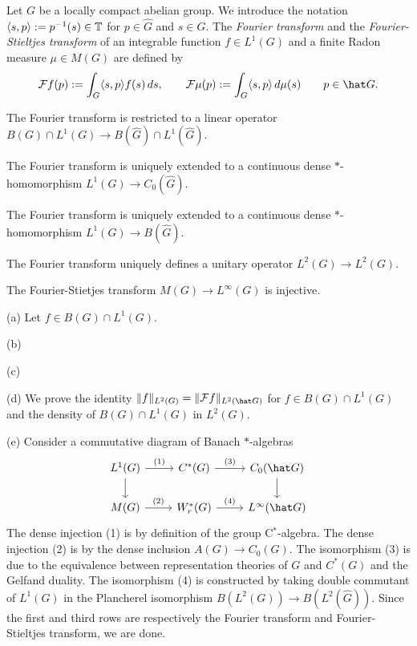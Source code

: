 \documentclass{../../large}
\begin{document}
\begin{prb}
Let $G$ be a locally compact abelian group.
We introduce the notation $\langle s,p\rangle:=p^{-1}(s)\in\mathbb{T}$ for $p\in\hat G$ and $s\in G$.
The \emph{Fourier transform} and the \emph{Fourier-Stieltjes transform} of an integrable function $f\in L^1(G)$ and a finite Radon measure $\mu\in M(G)$ are defined by
\[\cF f(p):=\int_G\<s,p\>f(s)\,ds,\qquad \cF\mu(p):=\int_G\<s,p\>\,d\mu(s)\qquad p\in\hat G.\]
\begin{parts}
\item The Fourier transform is restricted to a linear operator $B(G)\cap L^1(G)\to B(\hat G)\cap L^1(\hat G)$.
\item The Fourier transform is uniquely extended to a continuous dense $*$-homomorphism $L^1(G)\to C_0(\hat G)$.
\item The Fourier transform is uniquely extended to a continuous dense $*$-homomorphism $L^1(G)\to B(\hat G)$.
\item The Fourier transform uniquely defines a unitary operator $L^2(G)\to L^2(G)$.
\item The Fourier-Stietjes transform $M(G)\to L^\infty(G)$ is injective.
\end{parts}
\end{prb}
\begin{pf}
(a)
Let $f\in B(G)\cap L^1(G)$.


(b)

(c)

(d)
We prove the identity $\|f\|_{L^2(G)}=\|\cF f\|_{L^2(\hat G)}$ for $f\in B(G)\cap L^1(G)$ and the density of $B(G)\cap L^1(G)$ in $L^2(G)$.

(e)
Consider a commutative diagram of Banach $*$-algebras
\[\begin{tikzcd}
L^1(G) \rar{(1)}\dar & C^*(G) \rar{(3)} & C_0(\hat G) \dar\\
M(G) \rar{(2)} & W_r^*(G) \rar{(4)} & L^\infty(\hat G)
\end{tikzcd}\]
The dense injection (1) is by definition of the group C$^*$-algebra.
The dense injection (2) is by the dense inclusion $A(G)\to C_0(G)$.
The isomorphism (3) is due to the equivalence between representation theories of $G$ and $C^*(G)$ and the Gelfand duality.
The isomorphism (4) is constructed by taking double commutant of $L^1(G)$ in the Plancherel isomorphism $B(L^2(G))\to B(L^2(\hat G))$.
Since the first and third rows are respectively the Fourier transform and Fourier-Stieltjes transform, we are done.
\end{pf}
\end{document}
